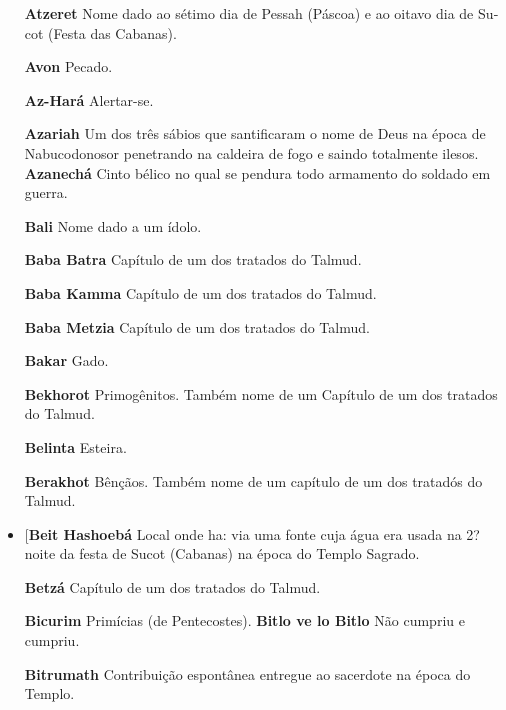 \begin{itemize}
\item[\textbf{Atzeret}] Nome dado ao sétimo dia de Pessah (Páscoa) e ao
oitavo dia de Su­cot (Festa das Cabanas).

\item[\textbf{Avon}] Pecado.

\item[\textbf{Az-Hará}] Alertar-se.

\item[\textbf{Azariah}] Um dos três sábios que san­tificaram o nome de Deus
na época de Nabucodonosor penetrando na caldei­ra de fogo e saindo
totalmente ilesos. \textbf{Azanechá} Cinto bélico no qual se pendura
todo armamento do soldado em guerra.

\item[\textbf{Bali}]  Nome dado a um ídolo.

\item[\textbf{Baba Batra}] Capítulo de um dos tra­tados do Talmud.

\item[\textbf{Baba Kamma}] Capítulo de um dos tratados do Talmud.

\item[\textbf{Baba Metzia}] Capítulo de um dos tra­tados do Talmud.

\item[\textbf{Bakar}] Gado.

\item[\textbf{Bekhorot}] Primogênitos. Também nome de um Capítulo de um dos
trata­dos do Talmud.

\item[\textbf{Belinta}] Esteira.

\item[\textbf{Berakhot}] Bênçãos. Também nome de um capítulo de um dos
tratadós do Talmud.

\item[\textbf{Beit Hashoebá} Local onde ha: via uma fonte
cuja água era usada na 2? noite da festa de Sucot (Cabanas) na época do
Templo Sagrado.

\item[\textbf{Betzá}] Capítulo de um dos tratados do Talmud.

\item[\textbf{Bicurim}] Primícias (de Pentecostes). \textbf{Bitlo ve lo Bitlo} Não cumpriu e cumpriu.

\item[\textbf{Bitrumath}]Contribuição espontânea entregue ao sacerdote na época do
Templo.


\end{itemize}
